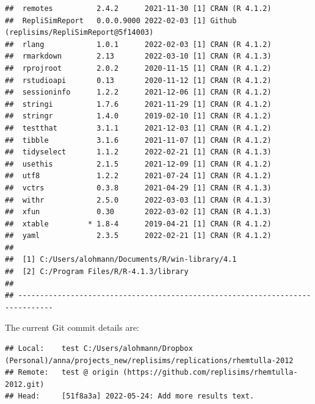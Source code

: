 \documentclass[10,a4paperpaper,]{article}
\begin{document}
\begin{verbatim}
##  remotes          2.4.2      2021-11-30 [1] CRAN (R 4.1.2)
##  RepliSimReport   0.0.0.9000 2022-02-03 [1] Github (replisims/RepliSimReport@5f14003)
##  rlang            1.0.1      2022-02-03 [1] CRAN (R 4.1.2)
##  rmarkdown        2.13       2022-03-10 [1] CRAN (R 4.1.3)
##  rprojroot        2.0.2      2020-11-15 [1] CRAN (R 4.1.2)
##  rstudioapi       0.13       2020-11-12 [1] CRAN (R 4.1.2)
##  sessioninfo      1.2.2      2021-12-06 [1] CRAN (R 4.1.2)
##  stringi          1.7.6      2021-11-29 [1] CRAN (R 4.1.2)
##  stringr          1.4.0      2019-02-10 [1] CRAN (R 4.1.2)
##  testthat         3.1.1      2021-12-03 [1] CRAN (R 4.1.2)
##  tibble           3.1.6      2021-11-07 [1] CRAN (R 4.1.2)
##  tidyselect       1.1.2      2022-02-21 [1] CRAN (R 4.1.3)
##  usethis          2.1.5      2021-12-09 [1] CRAN (R 4.1.2)
##  utf8             1.2.2      2021-07-24 [1] CRAN (R 4.1.2)
##  vctrs            0.3.8      2021-04-29 [1] CRAN (R 4.1.3)
##  withr            2.5.0      2022-03-03 [1] CRAN (R 4.1.3)
##  xfun             0.30       2022-03-02 [1] CRAN (R 4.1.3)
##  xtable         * 1.8-4      2019-04-21 [1] CRAN (R 4.1.2)
##  yaml             2.3.5      2022-02-21 [1] CRAN (R 4.1.2)
## 
##  [1] C:/Users/alohmann/Documents/R/win-library/4.1
##  [2] C:/Program Files/R/R-4.1.3/library
## 
## ------------------------------------------------------------------------------
\end{verbatim}

The current Git commit details are:

\begin{verbatim}
## Local:    test C:/Users/alohmann/Dropbox (Personal)/anna/projects_new/replisims/replications/rhemtulla-2012
## Remote:   test @ origin (https://github.com/replisims/rhemtulla-2012.git)
## Head:     [51f8a3a] 2022-05-24: Add more results text.
\end{verbatim}
\end{document}
